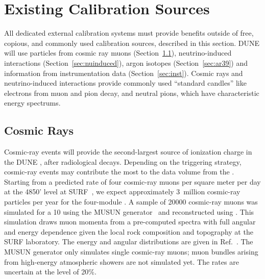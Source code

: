 \section{Existing Calibration Sources} \label{sec:existsource}

All dedicated external calibration systems must provide benefits outside of free, copious, and commonly used calibration sources, described in this section. DUNE will use particles from cosmic ray muons (Section~\ref{sec:cr}), neutrino-induced interactions (Section~\ref{sec:nuinduced}),  argon isotopes (Section~\ref{sec:ar39}) and information from instrumentation data  (Section~\ref{sec:inst}). Cosmic rays and neutrino-induced interactions provide commonly used ``standard candles'' like electrons from muon and pion decay, and neutral pions, which have characteristic energy spectrums. 

\subsection{Cosmic Rays }\label{sec:cr}

Cosmic-ray events will provide the second-largest source of ionization charge in the DUNE ,
after radiological decays.  Depending on the triggering strategy, cosmic-ray events may contribute the
most to the data volume from the \fardet.  Starting from a predicted rate of four cosmic-ray muons
per square meter per day at the 4850' level at SURF~\cite{LBNEDOCDB9673}, we expect 
approximately \num{3}~million cosmic-ray particles per year for the four-module .
A sample of \num{20000} cosmic-ray muons was simulated for a %
\SI{10}{\kt}  using the MUSUN
generator~\cite{Kudryavtsev:2008qh} and reconstructed using .  This simulation draws muon
momenta from a pre-computed spectra with full angular and energy dependence given the local rock
composition and topography at the SURF laboratory.  The energy and angular distributions are given
in Ref.~\cite{LBNEDOCDB9673}.  The MUSUN generator only simulates single cosmic-ray muons;
muon bundles arising from high-energy atmospheric showers are not simulated yet.
The rates are uncertain at the level of 20\%.

